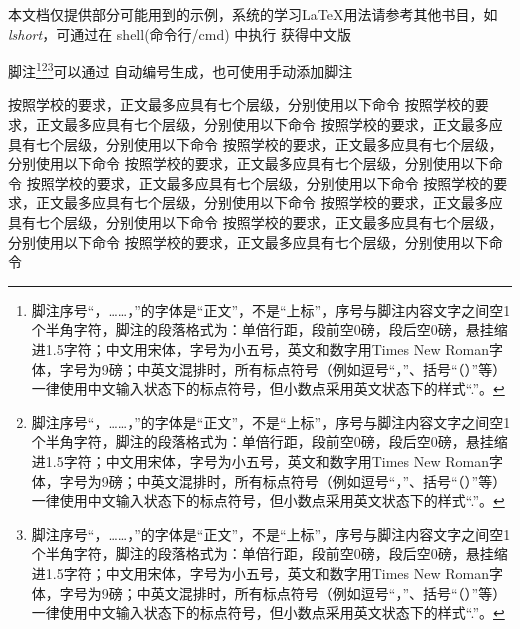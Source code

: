 



本文档仅提供部分可能用到的示例，系统的学习\LaTeX 用法请参考其他书目，如 \emph{lshort}，可通过在 shell(命令行/cmd) 中执行  获得中文版



脚注\footnote{脚注序号“，……，”的字体是“正文”，不是“上标”，序号与脚注内容文字之间空1个半角字符，脚注的段落格式为：单倍行距，段前空0磅，段后空0磅，悬挂缩进1.5字符；中文用宋体，字号为小五号，英文和数字用Times New Roman字体，字号为9磅；中英文混排时，所有标点符号（例如逗号“，”、括号“（）”等）一律使用中文输入状态下的标点符号，但小数点采用英文状态下的样式“.”。}\footnote{脚注序号“，……，”的字体是“正文”，不是“上标”，序号与脚注内容文字之间空1个半角字符，脚注的段落格式为：单倍行距，段前空0磅，段后空0磅，悬挂缩进1.5字符；中文用宋体，字号为小五号，英文和数字用Times New Roman字体，字号为9磅；中英文混排时，所有标点符号（例如逗号“，”、括号“（）”等）一律使用中文输入状态下的标点符号，但小数点采用英文状态下的样式“.”。}\footnote{脚注序号“，……，”的字体是“正文”，不是“上标”，序号与脚注内容文字之间空1个半角字符，脚注的段落格式为：单倍行距，段前空0磅，段后空0磅，悬挂缩进1.5字符；中文用宋体，字号为小五号，英文和数字用Times New Roman字体，字号为9磅；中英文混排时，所有标点符号（例如逗号“，”、括号“（）”等）一律使用中文输入状态下的标点符号，但小数点采用英文状态下的样式“.”。}可以通过 \clist{\footnote{}}自动编号生成，也可使用手动添加脚注


按照学校的要求，正文最多应具有七个层级，分别使用以下命令
按照学校的要求，正文最多应具有七个层级，分别使用以下命令
按照学校的要求，正文最多应具有七个层级，分别使用以下命令
按照学校的要求，正文最多应具有七个层级，分别使用以下命令
按照学校的要求，正文最多应具有七个层级，分别使用以下命令
按照学校的要求，正文最多应具有七个层级，分别使用以下命令
按照学校的要求，正文最多应具有七个层级，分别使用以下命令
按照学校的要求，正文最多应具有七个层级，分别使用以下命令
按照学校的要求，正文最多应具有七个层级，分别使用以下命令
按照学校的要求，正文最多应具有七个层级，分别使用以下命令

